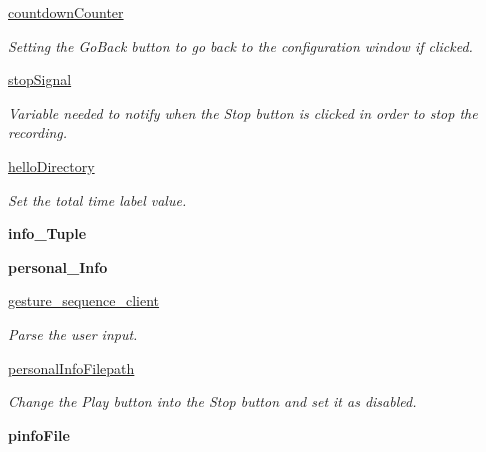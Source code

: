 \begin{DoxyCompactItemize}
\item 
\hyperlink{classGUI__node_1_1MainWindow_a4825057b1cb23f32b6263046b6cced7a}{countdown\+Counter}
\begin{DoxyCompactList}\small\item\em Setting the Go\+Back button to go back to the configuration window if clicked. \end{DoxyCompactList}\item 
\hyperlink{classGUI__node_1_1MainWindow_aa216ded91d1e59aebbe3fa86f2dc7c5c}{stop\+Signal}
\begin{DoxyCompactList}\small\item\em Variable needed to notify when the Stop button is clicked in order to stop the recording. \end{DoxyCompactList}\item 
\hyperlink{classGUI__node_1_1MainWindow_aebb76732e473e136740388734928307b}{hello\+Directory}
\begin{DoxyCompactList}\small\item\em Set the total time label value. \end{DoxyCompactList}\item 
{\bfseries info\+\_\+\+Tuple}\hypertarget{classGUI__node_1_1MainWindow_ae866b190751c10a56c2ecfb2e482fb56}{}\label{classGUI__node_1_1MainWindow_ae866b190751c10a56c2ecfb2e482fb56}

\item 
{\bfseries personal\+\_\+\+Info}\hypertarget{classGUI__node_1_1MainWindow_a57b63145c61a35295bff772ec1de64e4}{}\label{classGUI__node_1_1MainWindow_a57b63145c61a35295bff772ec1de64e4}

\item 
\hyperlink{classGUI__node_1_1MainWindow_a04c5542293c4d310ec05ac466b2caf09}{gesture\+\_\+sequence\+\_\+client}
\begin{DoxyCompactList}\small\item\em Parse the user input. \end{DoxyCompactList}\item 
\hyperlink{classGUI__node_1_1MainWindow_a51c1f3c6822991327e4e0debaedf17f5}{personal\+Info\+Filepath}
\begin{DoxyCompactList}\small\item\em Change the Play button into the Stop button and set it as disabled. \end{DoxyCompactList}\item 
{\bfseries pinfo\+File}\hypertarget{classGUI__node_1_1MainWindow_a351ef9a93060c35030095a9e2e933d45}{}\label{classGUI__node_1_1MainWindow_a351ef9a93060c35030095a9e2e933d45}


\end{DoxyCompactItemize}

